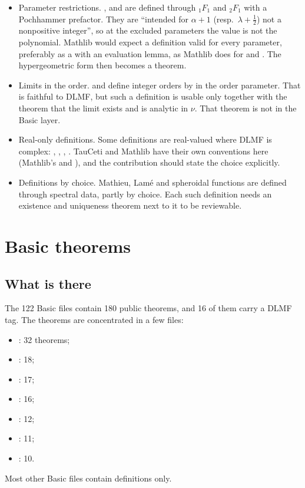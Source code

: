 \documentclass[11pt,a4paper]{article}
\begin{document}
\begin{itemize}
  \item Parameter restrictions. ,  and
     are defined through \({}_1F_1\) and \({}_2F_1\) with a Pochhammer
    prefactor. They are ``intended for \(\alpha+1\) (resp.\ \(\lambda+\tfrac12\)) not a
    nonpositive integer'', so at the excluded parameters the value is not the polynomial. Mathlib
    would expect a definition valid for every parameter, preferably as a
     with an evaluation lemma, as Mathlib does for 
    and . The hypergeometric form then becomes a theorem.
  \item Limits in the order.  and  define integer orders by
     in the order parameter. That is faithful to DLMF, but such a definition is
    usable only together with the theorem that the limit exists and is analytic in \(\nu\).
    That theorem is not in the Basic layer.
  \item Real-only definitions. Some definitions are real-valued where DLMF is complex:
    , , , . TauCeti and
    Mathlib have their own conventions here (Mathlib's  and
    ), and the contribution should state the choice explicitly.
  \item Definitions by choice. Mathieu, Lam\'e and spheroidal functions are defined through
    spectral data, partly by choice. Each such definition needs an existence and uniqueness
    theorem next to it to be reviewable.
\end{itemize}

\section{Basic theorems}\label{sec:theorems}

\subsection{What is there}

The 122 Basic files contain 180 public theorems, and 16 of them carry a DLMF tag. The theorems
are concentrated in a few files:
\begin{itemize}
  \item {}: 32 theorems;
  \item {}: 18;
  \item {}: 17;
  \item {}: 16;
  \item {}: 12;
  \item {}: 11;
  \item {}: 10.
\end{itemize}
Most other Basic files contain definitions only.
\end{document}
